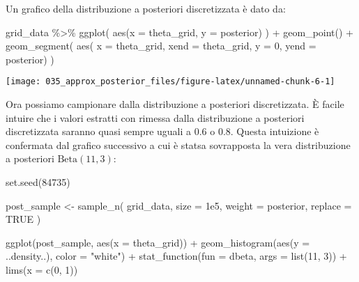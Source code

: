 \documentclass[
]{memoir}
\newenvironment{Shaded}{\begin{snugshade}}{\end{snugshade}}
\newcommand{\AttributeTok}[1]{\textcolor[rgb]{0.77,0.63,0.00}{#1}}
\newcommand{\ConstantTok}[1]{\textcolor[rgb]{0.00,0.00,0.00}{#1}}
\newcommand{\DecValTok}[1]{\textcolor[rgb]{0.00,0.00,0.81}{#1}}
\newcommand{\FloatTok}[1]{\textcolor[rgb]{0.00,0.00,0.81}{#1}}
\newcommand{\FunctionTok}[1]{\textcolor[rgb]{0.00,0.00,0.00}{#1}}
\newcommand{\NormalTok}[1]{#1}
\newcommand{\OtherTok}[1]{\textcolor[rgb]{0.56,0.35,0.01}{#1}}
\newcommand{\SpecialCharTok}[1]{\textcolor[rgb]{0.00,0.00,0.00}{#1}}
\newcommand{\StringTok}[1]{\textcolor[rgb]{0.31,0.60,0.02}{#1}}
\begin{document}
\noindent
Un grafico della distribuzione a posteriori discretizzata è dato da:

\begin{Shaded}
\begin{Highlighting}[]
\NormalTok{grid\_data }\SpecialCharTok{\%\textgreater{}\%} 
  \FunctionTok{ggplot}\NormalTok{(}
    \FunctionTok{aes}\NormalTok{(}\AttributeTok{x =}\NormalTok{ theta\_grid, }\AttributeTok{y =}\NormalTok{ posterior)}
\NormalTok{  ) }\SpecialCharTok{+}
  \FunctionTok{geom\_point}\NormalTok{() }\SpecialCharTok{+}
  \FunctionTok{geom\_segment}\NormalTok{(}
    \FunctionTok{aes}\NormalTok{(}
      \AttributeTok{x =}\NormalTok{ theta\_grid, }
      \AttributeTok{xend =}\NormalTok{ theta\_grid, }
      \AttributeTok{y =} \DecValTok{0}\NormalTok{, }
      \AttributeTok{yend =}\NormalTok{ posterior)}
\NormalTok{  )}
\end{Highlighting}
\end{Shaded}

\begin{center}\texttt{[image: 035\_approx\_posterior\_files/figure-latex/unnamed-chunk-6-1]} \end{center}

Ora possiamo campionare dalla distribuzione a posteriori discretizzata. È facile intuire che i valori estratti con rimessa dalla distribuzione a posteriori discretizzata saranno quasi sempre uguali a 0.6 o 0.8. Questa intuizione è confermata dal grafico successivo a cui è statsa sovrapposta la vera distribuzione a posteriori \(\mbox{Beta}(11, 3)\):

\begin{Shaded}
\begin{Highlighting}[]
\FunctionTok{set.seed}\NormalTok{(}\DecValTok{84735}\NormalTok{)}

\NormalTok{post\_sample }\OtherTok{\textless{}{-}} \FunctionTok{sample\_n}\NormalTok{(}
\NormalTok{  grid\_data,}
  \AttributeTok{size =} \FloatTok{1e5}\NormalTok{,}
  \AttributeTok{weight =}\NormalTok{ posterior,}
  \AttributeTok{replace =} \ConstantTok{TRUE}
\NormalTok{)}
\end{Highlighting}
\end{Shaded}

\begin{Shaded}
\begin{Highlighting}[]
\FunctionTok{ggplot}\NormalTok{(post\_sample, }\FunctionTok{aes}\NormalTok{(}\AttributeTok{x =}\NormalTok{ theta\_grid)) }\SpecialCharTok{+}
  \FunctionTok{geom\_histogram}\NormalTok{(}\FunctionTok{aes}\NormalTok{(}\AttributeTok{y =}\NormalTok{ ..density..), }\AttributeTok{color =} \StringTok{"white"}\NormalTok{) }\SpecialCharTok{+}
  \FunctionTok{stat\_function}\NormalTok{(}\AttributeTok{fun =}\NormalTok{ dbeta, }\AttributeTok{args =} \FunctionTok{list}\NormalTok{(}\DecValTok{11}\NormalTok{, }\DecValTok{3}\NormalTok{)) }\SpecialCharTok{+}
  \FunctionTok{lims}\NormalTok{(}\AttributeTok{x =} \FunctionTok{c}\NormalTok{(}\DecValTok{0}\NormalTok{, }\DecValTok{1}\NormalTok{))}
\end{Highlighting}
\end{Shaded}
\end{document}
